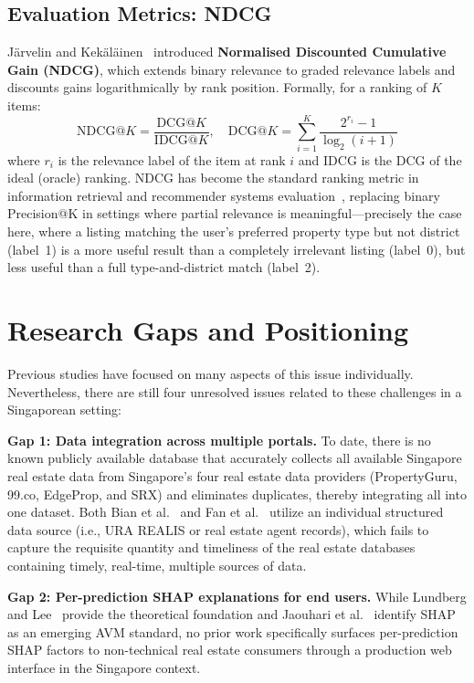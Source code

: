 \subsection{Evaluation Metrics: NDCG}

Järvelin and Kekäläinen~\cite{jarvelin2002cumulated} introduced \textbf{Normalised
Discounted Cumulative Gain (NDCG)}, which extends binary relevance to graded relevance
labels and discounts gains logarithmically by rank position. Formally, for a ranking of
$K$ items:
\[
\text{NDCG}@K = \frac{\text{DCG}@K}{\text{IDCG}@K}, \quad
\text{DCG}@K = \sum_{i=1}^{K} \frac{2^{r_i} - 1}{\log_2(i+1)}
\]
where $r_i$ is the relevance label of the item at rank $i$ and IDCG is the DCG of the
ideal (oracle) ranking. NDCG has become the standard ranking metric in information
retrieval and recommender systems evaluation~\cite{ricci2011introduction}, replacing
binary Precision@K in settings where partial relevance is meaningful---precisely the
case here, where a listing matching the user's preferred property type but not district
(label~1) is a more useful result than a completely irrelevant listing (label~0), but
less useful than a full type-and-district match (label~2).

\section{Research Gaps and Positioning}

Previous studies have focused on many aspects of this issue individually. Nevertheless, there are still four unresolved issues related to these challenges in a Singaporean setting:

\textbf{Gap 1: Data integration across multiple portals.}
To date, there is no known publicly available database that accurately collects all available Singapore real estate data from Singapore’s four real estate data providers (PropertyGuru, 99.co, EdgeProp, and SRX) and eliminates duplicates, thereby integrating all into one dataset. Both Bian et al.~\cite{bian2020comparing} and Fan et al.~\cite{fan2006determinants} utilize an individual structured data source (i.e., URA REALIS or real estate agent records), which fails to capture the requisite quantity and timeliness of the real estate databases containing timely, real-time, multiple sources of data.

\textbf{Gap 2: Per-prediction SHAP explanations for end users.}
While Lundberg and Lee~\cite{lundberg2017unified} provide the theoretical foundation and
Jaouhari et al.~\cite{jaouhari2024mapping} identify SHAP as an emerging AVM standard, no prior
work specifically surfaces per-prediction SHAP factors to non-technical real estate consumers
through a production web interface in the Singapore context.

